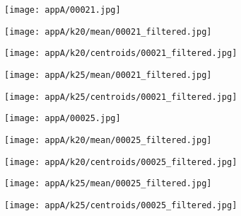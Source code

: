 \documentclass[draft,final]{vutinfth} %
\begin{document}
\begin{appendices}
\begin{figure}[h]
\centering
  \begin{subfigure}[b]{0.19\columnwidth}
    \centering
    \texttt{[image: appA/00021.jpg]}
  \end{subfigure}
  \begin{subfigure}[b]{0.19\columnwidth}
    \centering
    \texttt{[image: appA/k20/mean/00021\_filtered.jpg]}
  \end{subfigure}
  \begin{subfigure}[b]{0.19\columnwidth}
    \centering
    \texttt{[image: appA/k20/centroids/00021\_filtered.jpg]}
  \end{subfigure}
  \begin{subfigure}[b]{0.19\columnwidth}
    \centering
    \texttt{[image: appA/k25/mean/00021\_filtered.jpg]}
  \end{subfigure}
  \begin{subfigure}[b]{0.19\columnwidth}
    \centering
    \texttt{[image: appA/k25/centroids/00021\_filtered.jpg]}
  \end{subfigure}
\caption{}
\end{figure}  

\begin{figure}[h]
\centering
  \begin{subfigure}[b]{0.19\columnwidth}
    \centering
    \texttt{[image: appA/00025.jpg]}
  \end{subfigure}
  \begin{subfigure}[b]{0.19\columnwidth}
    \centering
    \texttt{[image: appA/k20/mean/00025\_filtered.jpg]}
  \end{subfigure}
  \begin{subfigure}[b]{0.19\columnwidth}
    \centering
    \texttt{[image: appA/k20/centroids/00025\_filtered.jpg]}
  \end{subfigure}
  \begin{subfigure}[b]{0.19\columnwidth}
    \centering
    \texttt{[image: appA/k25/mean/00025\_filtered.jpg]}
  \end{subfigure}
  \begin{subfigure}[b]{0.19\columnwidth}
    \centering
    \texttt{[image: appA/k25/centroids/00025\_filtered.jpg]}
  \end{subfigure}
\caption{}
\end{figure}  


\end{appendices}
\end{document}
